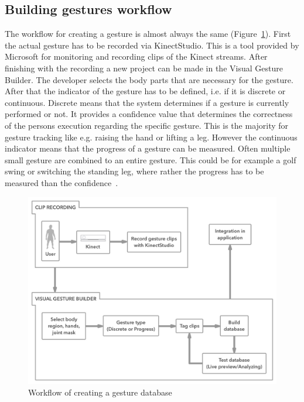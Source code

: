 \subsection{Building gestures workflow}
The workflow for creating a gesture is almost always the same (Figure~\ref{fig:5_3_gestureCreation}). 
First the actual gesture has to be recorded via KinectStudio. This is a tool provided by Microsoft for monitoring and recording clips of the Kinect streams. After finishing with the recording a new project can be made in the Visual Gesture Builder. The developer selects the body parts that are necessary for the gesture. After that the indicator of the gesture has to be defined, i.e. if it is discrete or continuous. Discrete means that the system determines if a gesture is currently performed or not. It provides a confidence value that determines the correctness of the persons execution regarding the specific gesture. This is the majority for gesture tracking like e.g. raising the hand or lifting a leg. However the continuous indicator means that the progress of a gesture can be measured. Often multiple small gesture are combined to an entire gesture. This could be for example a golf swing or switching the standing leg, where rather the progress has to be measured than the confidence~\cite{MicrosoftVGB}.

\begin{figure}[htb]
	\centering
	\begin{minipage}[t]{1\linewidth}
		\centering
		\includegraphics[width=1\linewidth]{Pictures/5_3_gestureCreation}
		\caption{Workflow of creating a gesture database}
		\label{fig:5_3_gestureCreation}
	\end{minipage}
\end{figure}

